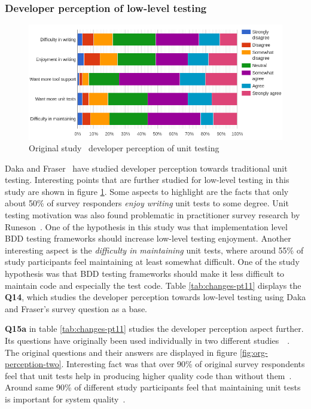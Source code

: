 \subsubsection{Developer perception of low-level testing}
    \begin{figure}[ht]
      \begin{center}
        \includegraphics[width=14.7cm]{images/perception-org.png}
        \caption{Original study~\cite{daka2014survey} developer perception of unit testing}
        \label{fig:org-perception}
      \end{center}
    \end{figure}

Daka and Fraser~\cite{daka2014survey} have studied developer perception towards traditional unit testing. Interesting
points that are further studied for low-level testing in this study are shown in figure \ref{fig:org-perception}. Some
aspects to highlight are the facts that only about 50\% of survey responders \textit{enjoy writing} unit tests to some degree. Unit
testing motivation was also found problematic in practitioner survey research by Runeson~\cite{runeson2006survey}.
One of the hypothesis in this study was that implementation level BDD testing frameworks should increase low-level testing enjoyment.
Another interesting aspect is the \textit{difficulty in maintaining} unit tests, where around 55\% of study participants
feel maintaining at least somewhat difficult. One of the study hypothesis was that BDD testing frameworks should
make it less difficult to maintain code and especially the test code. Table \ref{tab:changes-pt11} displays the \textbf{Q14}, which studies
the developer perception towards low-level testing using Daka and Fraser's survey question as a base.

\textbf{Q15a} in table \ref{tab:changes-pt11} studies the developer perception aspect further. Its questions have originally
been used individually in two different studies~\cite{williams2009effectiveness}~\cite{li2016automatically}. The original
questions and their answers are displayed in figure \ref{fig:org-perception-two}. Interesting fact was that over 90\% of
original survey respondents feel that unit tests help in producing higher quality code than without them~\cite{williams2009effectiveness}.
Around same 90\% of different study participants feel that maintaining unit tests is important for system quality~\cite{li2016automatically}.

